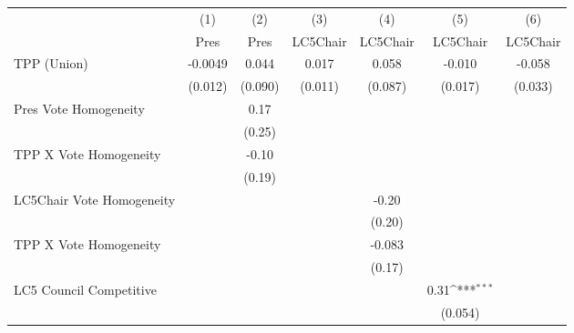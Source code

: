 {
\def\sym#1{\ifmmode^{#1}\else\(^{#1}\)\fi}
\begin{tabular}{l*{6}{c}}
\toprule
                &\multicolumn{1}{c}{(1)}&\multicolumn{1}{c}{(2)}&\multicolumn{1}{c}{(3)}&\multicolumn{1}{c}{(4)}&\multicolumn{1}{c}{(5)}&\multicolumn{1}{c}{(6)}\\
                &\multicolumn{1}{c}{Pres}&\multicolumn{1}{c}{Pres}&\multicolumn{1}{c}{LC5Chair}&\multicolumn{1}{c}{LC5Chair}&\multicolumn{1}{c}{LC5Chair}&\multicolumn{1}{c}{LC5Chair}\\
\midrule
TPP (Union)     &  -0.0049         &    0.044         &    0.017         &    0.058         &   -0.010         &   -0.058         \\
                &  (0.012)         &  (0.090)         &  (0.011)         &  (0.087)         &  (0.017)         &  (0.033)         \\
Pres Vote Homogeneity&                  &     0.17         &                  &                  &                  &                  \\
                &                  &   (0.25)         &                  &                  &                  &                  \\
TPP X Vote Homogeneity&                  &    -0.10         &                  &                  &                  &                  \\
                &                  &   (0.19)         &                  &                  &                  &                  \\
LC5Chair Vote Homogeneity&                  &                  &                  &    -0.20         &                  &                  \\
                &                  &                  &                  &   (0.20)         &                  &                  \\
TPP X Vote Homogeneity&                  &                  &                  &   -0.083         &                  &                  \\
                &                  &                  &                  &   (0.17)         &                  &                  \\
LC5 Council Competitive&                  &                  &                  &                  &     0.31\sym{***}&                  \\
                &                  &                  &                  &                  &  (0.054)         &                  \\

\end{tabular}}
